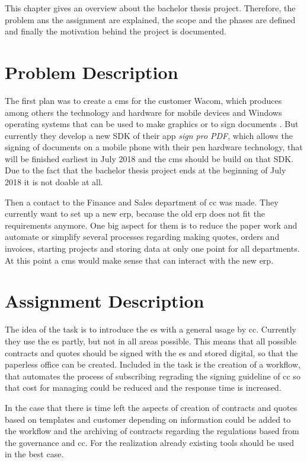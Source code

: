  This chapter gives an overview about the bachelor thesis project. Therefore, the problem ans the assignment are explained, the scope and the phases are defined and finally the motivation behind the project is documented.
 
 \section{Problem Description}
 The first plan was to create a \gls{cms} for the customer Wacom, which produces among others the technology and hardware for mobile devices and Windows operating systems that can be used to make graphics or to sign documents \parencite{wacom2018about}. But currently they develop a new \gls{SDK} of their \gls{app} \textit{sign pro PDF}, which allows the signing of documents on a mobile phone with their pen hardware technology\parencite{wacom2018sign}, that will be finished earliest in July 2018 and the \gls{cms} should be build on that \gls{SDK}. Due to the fact that the bachelor thesis project ends at the beginning of July 2018 it is not doable at all.
 
 Then a contact to the Finance and Sales department of \gls{cc} was made. They currently want to set up a new \gls{erp}, because the old \gls{erp} does not fit the requirements anymore. One big aspect for them is to reduce the paper work and automate or simplify several processes regarding making quotes, orders and invoices, starting projects and storing data at only one point for all departments. At this point a \gls{cms} would make sense that can interact with the new \gls{erp}.

 \section{Assignment Description}
 The idea of the task is to introduce the \gls{es} with a general usage by \gls{cc}. Currently they use the \gls{es} partly, but not in all areas possible.
 This means that all possible contracts and quotes should be signed with the \gls{es} and stored digital, so that the paperless office can be created. Included in the task is the creation of a workflow, that automates the process of subscribing regrading the signing guideline of \gls{cc} so that cost for managing could be reduced and the response time is increased.
 
 In the case that there is time left the aspects of creation of contracts and quotes based on templates and customer depending on information could be added to the workflow and the archiving of contracts regarding the regulations based from the governance and \gls{cc}. For the realization already existing tools should be used in the best case.
 
